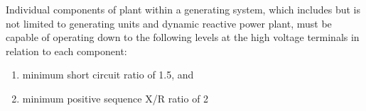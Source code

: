 Individual components of plant within a generating system, which includes but is not limited to generating units and dynamic reactive power plant, must be capable of operating down to the following levels at the high voltage terminals in relation to each component:

\begin{enumerate}[label=(\alph*)]
	\item minimum short circuit ratio of 1.5, and  
	\item minimum positive sequence X/R ratio of 2  
\end{enumerate}